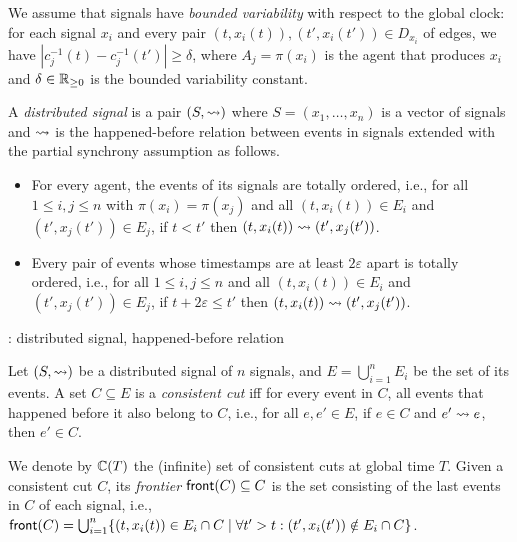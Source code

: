 We assume that signals have \emph{bounded variability} with respect to the global clock: for each signal $x_i$ and every pair $(t, x_i(t)), (t', x_i(t')) \in D_{x_i}$ of edges, we have $|c_j^{-1}(t) - c_j^{-1}(t')| \geq \delta$, where $A_j = \pi(x_i)$ is the agent that produces $x_i$ and $\delta \in \mathbb{R}_{\geq 0}$ is the bounded variability constant.


\begin{definition} \label{defn:hb}
	A \emph{distributed signal} is a pair $(S, {\rightsquigarrow})$ where $S = (x_1, \ldots, x_n)$ is a vector of signals and ${\rightsquigarrow}$ is the happened-before relation between events in signals extended with the partial synchrony assumption as follows.
	\begin{itemize}
		\item For every agent, the events of its signals are totally ordered, i.e., for all $1 \leq i,j \leq n$ with $\pi(x_i) = \pi(x_j)$ and all $(t, x_i(t)) \in E_i$ and $(t', x_j(t')) \in E_j$, if $t < t'$ then $(t, x_i(t)) \rightsquigarrow (t', x_j(t'))$.
		\item Every pair of events whose timestamps are at least $2 \varepsilon$ apart is totally ordered, i.e., for all $1 \leq i,j \leq n$ and all $(t, x_i(t)) \in E_i$ and $(t', x_j(t')) \in E_j$, if $t + 2\varepsilon \leq t'$ then $(t, x_i(t)) \rightsquigarrow (t', x_j(t'))$. 
	\end{itemize}
\end{definition}

\begin{example}
	\TODO: distributed signal, happened-before relation
\end{example}

\begin{definition}
	Let $(S, {\rightsquigarrow})$ be a distributed signal of $n$ signals, and $E = \bigcup_{i = 1}^{n} E_i$ be the set of its events.
	A set $C \subseteq E$ is a \emph{consistent cut} iff for every event in $C$, all events that happened before  it also belong to $C$, i.e., for all $e, e' \in E$, if $e \in C$ and $e' \rightsquigarrow e$, then $e' \in C$.
\end{definition}

We denote by $\mathbb{C}(T)$ the (infinite) set of consistent cuts at global time $T$.
Given a consistent cut $C$, its \emph{frontier} $\mathsf{front}(C) \subseteq C$ is the set consisting of the last events in $C$ of each signal, i.e., $\fr(C) = \bigcup_{i = 1}^{n} \{ (t, x_i(t)) \in E_i \cap C \st \forall t' > t : (t', x_i(t')) \notin E_i \cap C \}$.

